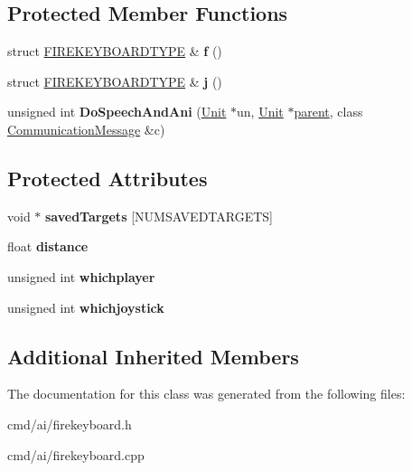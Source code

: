 \subsection*{Protected Member Functions}
\begin{DoxyCompactItemize}
\item 
struct \hyperlink{structFIREKEYBOARDTYPE}{F\+I\+R\+E\+K\+E\+Y\+B\+O\+A\+R\+D\+T\+Y\+PE} \& {\bfseries f} ()\hypertarget{classFireKeyboard_ae73da382d675d107e2c218aa967a78ef}{}\label{classFireKeyboard_ae73da382d675d107e2c218aa967a78ef}

\item 
struct \hyperlink{structFIREKEYBOARDTYPE}{F\+I\+R\+E\+K\+E\+Y\+B\+O\+A\+R\+D\+T\+Y\+PE} \& {\bfseries j} ()\hypertarget{classFireKeyboard_add508ba51e8196587bac3e6451ecbad4}{}\label{classFireKeyboard_add508ba51e8196587bac3e6451ecbad4}

\item 
unsigned int {\bfseries Do\+Speech\+And\+Ani} (\hyperlink{classUnit}{Unit} $\ast$un, \hyperlink{classUnit}{Unit} $\ast$\hyperlink{classOrder_a57548b2476945f89ac22fafa4cb5863b}{parent}, class \hyperlink{classCommunicationMessage}{Communication\+Message} \&c)\hypertarget{classFireKeyboard_aeab1f841bf6914e8ba84be3448fb222d}{}\label{classFireKeyboard_aeab1f841bf6914e8ba84be3448fb222d}

\end{DoxyCompactItemize}
\subsection*{Protected Attributes}
\begin{DoxyCompactItemize}
\item 
void $\ast$ {\bfseries saved\+Targets} \mbox{[}N\+U\+M\+S\+A\+V\+E\+D\+T\+A\+R\+G\+E\+TS\mbox{]}\hypertarget{classFireKeyboard_a44a14e6f90e5769d5d66c442c3f7f020}{}\label{classFireKeyboard_a44a14e6f90e5769d5d66c442c3f7f020}

\item 
float {\bfseries distance}\hypertarget{classFireKeyboard_a5b314633e785747882d31442f1321ee2}{}\label{classFireKeyboard_a5b314633e785747882d31442f1321ee2}

\item 
unsigned int {\bfseries whichplayer}\hypertarget{classFireKeyboard_a9aae8f6c25b1e54cb50ad0b248e7b94c}{}\label{classFireKeyboard_a9aae8f6c25b1e54cb50ad0b248e7b94c}

\item 
unsigned int {\bfseries whichjoystick}\hypertarget{classFireKeyboard_acbee5d1ae4f427d6b07db6ba1ea4b9f3}{}\label{classFireKeyboard_acbee5d1ae4f427d6b07db6ba1ea4b9f3}

\end{DoxyCompactItemize}
\subsection*{Additional Inherited Members}


The documentation for this class was generated from the following files\+:\begin{DoxyCompactItemize}
\item 
cmd/ai/firekeyboard.\+h\item 
cmd/ai/firekeyboard.\+cpp\end{DoxyCompactItemize}
